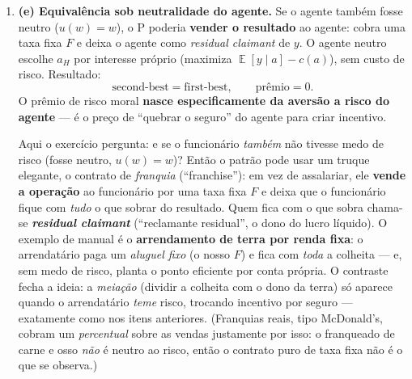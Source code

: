 \documentclass[11pt,a4paper]{article}
\DeclareMathOperator{\Esp}{\mathbb{E}}
\begin{document}
\begin{enumerate}[leftmargin=2em,itemsep=4pt]
\begin{empalavras}[O que significa ``prêmio de risco moral'' = 4]
\smallskip\noindent
Note a simetria: o lucro do patrão também cai exatamente $4$ (de $39$ para $35$). Faz
sentido — o valor que o projeto gera ($64$ em média) não mudou; o que mudou foi que $4$
unidades a mais saíram do bolso do patrão na forma de folha. \textbf{Atenção a uma confusão
clássica:} o funcionário \emph{não} fica $4$ mais rico. A satisfação dele continua em
$\bar U = 3$, igual ao first-best — a IR aperta nos dois mundos. Os $4$ extras de salário
esperado são \emph{inteiramente devorados} pelo desprazer de carregar o bônus arriscado:
não são presente a ninguém. Por isso esse $4$ é um \emph{custo da assimetria de informação}
— riqueza que \textbf{evapora} (peso morto): quem perde os $4$ é o patrão, e quem ganha
é\ldots\ ninguém.
Em CEO, é o desconto que acionistas pagam ao dar \emph{stock options} arriscadas em vez de
salário fixo.
\end{empalavras}

\item \textbf{(e) Equivalência sob neutralidade do agente.} Se o agente também fosse
neutro ($u(w)=w$), o P poderia \textbf{vender o resultado} ao agente: cobra uma taxa fixa
$F$ e deixa o agente como \emph{residual claimant} de $y$. O agente neutro escolhe $a_H$
por interesse próprio (maximiza $\Esp[y\mid a]-c(a)$), sem custo de risco. Resultado:
\[
\text{second-best} = \text{first-best}, \qquad \text{prêmio} = 0.
\]
O prêmio de risco moral \textbf{nasce especificamente da aversão a risco do agente} — é o
preço de ``quebrar o seguro'' do agente para criar incentivo.

\begin{empalavras}
Aqui o exercício pergunta: e se o funcionário \emph{também} não tivesse medo de risco
(fosse neutro, $u(w) = w$)? Então o patrão pode usar um truque elegante, o contrato de
\emph{franquia} (``franchise''): em vez de assalariar, ele \textbf{vende a operação} ao
funcionário por uma taxa fixa $F$ e deixa que o funcionário fique com \emph{tudo} o que
sobrar do resultado. Quem fica com o que sobra chama-se \textbf{\emph{residual claimant}}
(``reclamante residual'', o dono do lucro líquido). O exemplo de manual é o
\textbf{arrendamento de terra por renda fixa}: o arrendatário paga um \emph{aluguel fixo}
(o nosso $F$) e fica com \emph{toda} a colheita — e, sem medo de risco, planta o ponto
eficiente por conta própria. O contraste fecha a ideia: a \emph{meiação} (dividir a colheita
com o dono da terra) só aparece quando o arrendatário \emph{teme} risco, trocando incentivo
por seguro — exatamente como nos itens anteriores. (Franquias reais, tipo McDonald's, cobram
um \emph{percentual} sobre as vendas justamente por isso: o franqueado de carne e osso
\emph{não} é neutro ao risco, então o contrato puro de taxa fixa não é o que se observa.)


\end{empalavras}
\end{enumerate}
\end{document}
